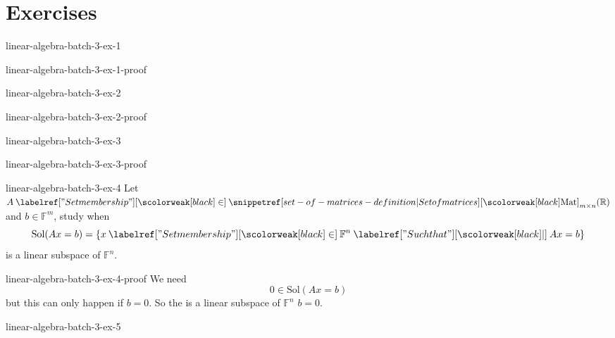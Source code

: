 \documentclass[preview]{standalone}
\begin{document}
\genpage

\section{Exercises}

\begin{snippetexercise}{linear-algebra-batch-3-ex-1}{}
    \todo
\end{snippetexercise}

\begin{snippetsolution}{linear-algebra-batch-3-ex-1-proof}{}
    \todo
\end{snippetsolution}

\begin{snippetexercise}{linear-algebra-batch-3-ex-2}{}
    \todo
\end{snippetexercise}

\begin{snippetsolution}{linear-algebra-batch-3-ex-2-proof}{}
    \todo
\end{snippetsolution}

\begin{snippetexercise}{linear-algebra-batch-3-ex-3}{}
    \todo
\end{snippetexercise}

\begin{snippetsolution}{linear-algebra-batch-3-ex-3-proof}{}
    \todo
\end{snippetsolution}

\begin{snippetexercise}{linear-algebra-batch-3-ex-4}{}
    Let \(A \in \matrices_{m\times n}(\mathbb{R})\) and \(b\in \mathbb{F}^m\),
    study when
    \[
        \text{Sol}(Ax = b) = \{
            x \in \mathbb{F}^n \suchthat Ax = b
        \}
    \]
    is a linear subspace of \(\mathbb{F}^n\).
\end{snippetexercise}

\begin{snippetsolution}{linear-algebra-batch-3-ex-4-proof}{}
    We need
    \[
        0 \in \text{Sol}(Ax = b)
    \]
    but this can only happen if \(b = 0\). So the \set
    is a linear subspace of \(\mathbb{F}^n\) \ifandonlyif
    \(b=0\).
\end{snippetsolution}

\begin{snippetexercise}{linear-algebra-batch-3-ex-5}{}
    \todo
\end{snippetexercise}
\end{document}
